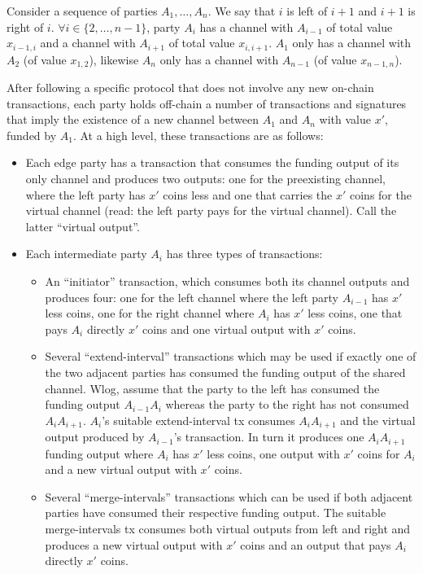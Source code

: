 Consider a sequence of parties $A_1, \dots, A_n$. We say that $i$ is left of
$i+1$ and $i+1$ is right of $i$. $\forall i \in \{2, \dots, n-1\}$, party $A_i$
has a channel with $A_{i-1}$ of total value $x_{i-1, i}$ and a channel with
$A_{i+1}$ of total value $x_{i, i+1}$. $A_1$ only has a channel with $A_2$ (of
value $x_{1, 2}$), likewise $A_n$ only has a channel with $A_{n-1}$ (of value
$x_{n-1, n}$).

After following a specific protocol that does not involve any new on-chain
transactions, each party holds off-chain a number of transactions and signatures
that imply the existence of a new channel between $A_1$ and $A_n$ with value
$x'$, funded by $A_1$. At a high level, these transactions are as follows:
\begin{itemize}
  \item Each edge party has a transaction that consumes the funding output of
  its only channel and produces two outputs: one for the preexisting channel,
  where the left party has $x'$ coins less and one that carries the $x'$ coins
  for the virtual channel (read: the left party pays for the virtual channel).
  Call the latter ``virtual output''.
  \item Each intermediate party $A_i$ has three types of transactions:
  \begin{itemize}
    \item An ``initiator'' transaction, which consumes both its channel outputs
    and produces four: one for the left channel where the left party $A_{i-1}$
    has $x'$ less coins, one for the right channel where $A_i$ has $x'$ less
    coins, one that pays $A_i$ directly $x'$ coins and one virtual output with
    $x'$ coins.
    \item Several ``extend-interval'' transactions which may be used if exactly
    one of the two adjacent parties has consumed the funding output of the
    shared channel. Wlog, assume that the party to the left has consumed the
    funding output $A_{i-1} A_i$ whereas the party to the right has not consumed
    $A_i A_{i+1}$. $A_i$'s suitable extend-interval tx consumes $A_i A_{i+1}$
    and the virtual output produced by $A_{i-1}$'s transaction. In turn it
    produces one $A_i A_{i+1}$ funding output where $A_i$ has $x'$ less coins,
    one output with $x'$ coins for $A_i$ and a new virtual output with $x'$
    coins.
    \item Several ``merge-intervals'' transactions which can be used if both
    adjacent parties have consumed their respective funding output. The suitable
    merge-intervals tx consumes both virtual outputs from left and right and
    produces a new virtual output with $x'$ coins and an output that pays $A_i$
    directly $x'$ coins.
  \end{itemize}


\end{itemize}
